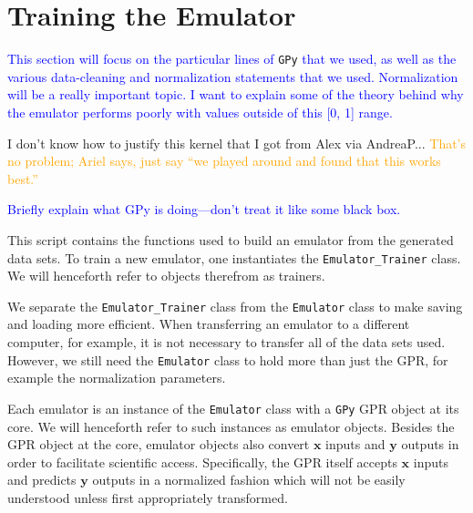 \section{Training the Emulator}
\label{sec: train_emu}


\textcolor{blue}{This section will focus on the particular lines of}
\verb|GPy| \textcolor{blue}{that we used, as well
as the various data-cleaning and normalization statements that we used.
Normalization will be a really important topic. I want to explain some of
the theory behind why the emulator performs poorly with values outside of this
[0, 1] range.}

I don't know how to justify this kernel that I got from Alex via AndreaP...
\textcolor{orange}{That's no problem; Ariel says, just say ``we played around
and found that this works best.''}

\textcolor{blue}{Briefly explain what GPy is doing—don’t treat it like some black box.}

This script contains the functions used to build an emulator from the 
generated data sets. To train a new emulator, one instantiates the
\verb|Emulator_Trainer| class. We will henceforth refer to objects therefrom 
as trainers.

We separate the \verb|Emulator_Trainer| class from the \verb|Emulator| class
to make saving and loading more efficient. When transferring an emulator to a
different computer, for example, it is not necessary to transfer all of the
data sets used.
However, we still need the \verb|Emulator| class to hold more than just the 
GPR, for example the normalization parameters.

Each emulator is an instance of
the \verb|Emulator| class with a \verb|GPy| GPR object at its core. We will 
henceforth refer to such instances as emulator objects. Besides the GPR object 
at the core, emulator objects also convert $\bm{x}$ inputs and
$\bm{y}$ outputs in order to facilitate scientific access. Specifically, 
the GPR itself accepts $\bm{x}$ inputs and predicts $\bm{y}$ outputs 
in a normalized fashion which will not be easily understood unless first 
appropriately transformed.

